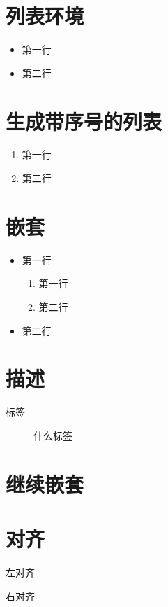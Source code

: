 \documentclass{ctexbook}
\begin{document}
	\section{列表环境}
	\begin{itemize}
		\item 第一行
		\item 第二行
	\end{itemize} 
	
	\section*{生成带序号的列表}
	\begin{enumerate}
		\item 第一行
		\item 第二行
	\end{enumerate}
	
	\section*{嵌套}
	\begin{itemize}
		\item 第一行
		\begin{enumerate}
			\item 第一行
			\item 第二行
		\end{enumerate}
		\item 第二行
		
	\end{itemize}
	
	\section*{描述}
	\begin{description}
		\item[标签] 什么标签
	\end{description}
	
	\section*{继续嵌套}
	
	\section{对齐}
	\begin{flushleft}
		左对齐
	\end{flushleft}
	
	\begin{flushright}
		右对齐
	\end{flushright}
	
\end{document}
